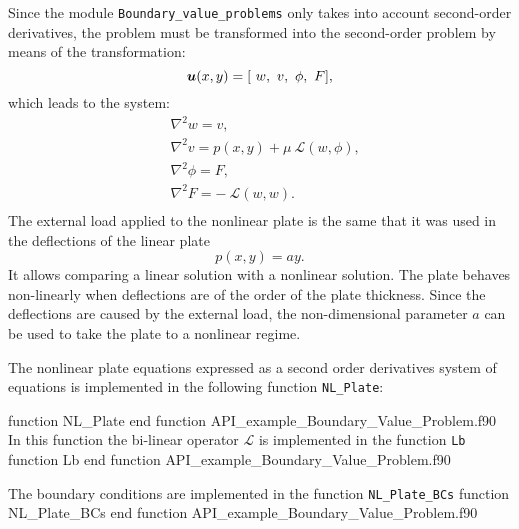         
Since the module \verb|Boundary_value_problems|  only takes into account  second-order derivatives, the problem must be  transformed into the 
second-order problem by means of the transformation:
               \begin{equation*}
                  \boldsymbol{u}(x,y) = [ \  w, \ v, \ \phi, \ F ],
               \end{equation*}
               which leads to the system: 
               \begin{align*}
                      &    \nabla^2 w  = v, \\
                   &    \nabla^2 v = p(x,y)+ \mu \ \mathcal{L}(w,\phi), \\
                      &    \nabla^2 \phi = F, \\
                      &    \nabla^2 F = - \ \mathcal{L}(w,w).  \\
              \end{align*}
The external load applied to the nonlinear plate is the same that it was used in the deflections of the linear plate 
       $$
                       p(x,y) = a y. 
       $$
It allows comparing a linear solution with a nonlinear solution. The plate behaves non-linearly when deflections are of the order of the 
plate thickness. Since the deflections are caused by the external load, the non-dimensional parameter $ a $ can be used to take the plate to 
a nonlinear regime.   
     
The nonlinear plate equations expressed as a second order derivatives system of equations is implemented in the following function 
\verb|NL_Plate|: 
       
      
   \vspace{0.5cm} 
   {function NL_Plate}
   {end function}
   {API_example_Boundary_Value_Problem.f90}
   In this function the bi-linear operator  $\mathcal{L}$ is implemented in the function \verb|Lb| 
   \vspace{0.5cm} 
   {function Lb}
   {end function}
   {API_example_Boundary_Value_Problem.f90}
       
       
       
The boundary conditions are implemented in the function \verb|NL_Plate_BCs|
          \vspace{0.5cm} 
          {function NL_Plate_BCs}
          {end function}
          {API_example_Boundary_Value_Problem.f90}
         
